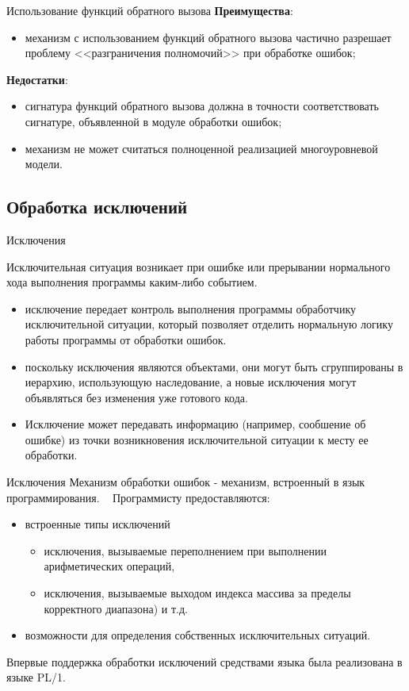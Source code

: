 \documentclass[xcolor=table]{beamer}
\begin{document}
\begin{frame}{Использование функций обратного вызова}
	\textbf{Преимущества}:
	\begin{itemize}
		\item механизм с использованием функций обратного вызова частично разрешает проблему <<разграничения полномочий>> при обработке ошибок;
	\end{itemize}
	\textbf{Недостатки}:
	\begin{itemize}	
		\item сигнатура функций обратного вызова должна в точности соответствовать сигнатуре, объявленной в модуле обработки ошибок;
		\item механизм не может считаться полноценной реализацией многоуровневой модели.
	\end{itemize}
\end{frame}

\subsection{Обработка исключений}

\begin{frame}{Исключения}
	\begin{block}{Исключительная ситуация}
	возникает при ошибке или прерывании нормального хода выполнения программы каким-либо событием.
	\end{block}
	\begin{itemize}
		\item исключение передает контроль выполнения программы обработчику исключительной ситуации, который позволяет отделить нормальную логику работы программы от обработки ошибок. 
		\item поскольку исключения являются объектами, они могут быть сгруппированы в иерархию, использующую наследование, а новые исключения могут объявляться без изменения уже готового кода. 
		\item Исключение может передавать информацию (например, сообшение об ошибке) из точки возникновения исключительной ситуации к месту ее обработки.
	\end{itemize}
\end{frame}

\begin{frame}{Исключения}
	Механизм обработки ошибок - механизм, встроенный в язык программирования.
	~
	Программисту предоставляются:
	\begin{itemize}
		\item встроенные типы исключений
		\begin{itemize}
			\item исключения, вызываемые переполнением при выполнении арифметических операций, 
			\item исключения, вызываемые выходом индекса массива за пределы корректного диапазона) и т.д.
		\end{itemize} 
		\item возможности для определения собственных исключительных ситуаций.
	\end{itemize}
	Впервые поддержка обработки исключений средствами языка была реализована в языке PL/1.
\end{frame}
\end{document}
